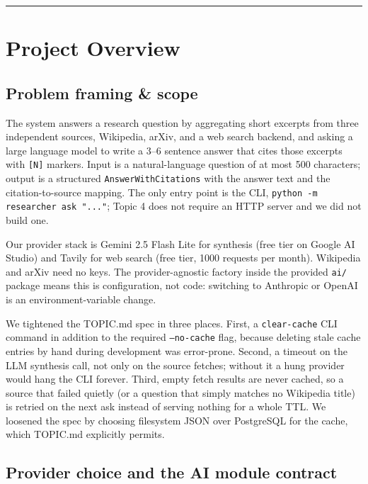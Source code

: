 \documentclass[11pt,a4paper]{article}
\begin{document}
\tableofcontents
\vspace{0.6em}\hrule\vspace{0.4em}

\section{Project Overview}

\subsection{Problem framing \& scope}

The system answers a research question by aggregating short excerpts from three independent sources, Wikipedia, arXiv, and a web search backend, and asking a large language model to write a 3--6 sentence answer that cites those excerpts with \texttt{[N]} markers. Input is a natural-language question of at most 500 characters; output is a structured \texttt{AnswerWithCitations} with the answer text and the citation-to-source mapping. The only entry point is the CLI, \texttt{python -m researcher ask "..."}; Topic 4 does not require an HTTP server and we did not build one.

Our provider stack is Gemini 2.5 Flash Lite for synthesis (free tier on Google AI Studio) and Tavily for web search (free tier, 1000 requests per month). Wikipedia and arXiv need no keys. The provider-agnostic factory inside the provided \texttt{ai/} package means this is configuration, not code: switching to Anthropic or OpenAI is an environment-variable change.

We tightened the TOPIC.md spec in three places. First, a \texttt{clear-cache} CLI command in addition to the required \texttt{--no-cache} flag, because deleting stale cache entries by hand during development was error-prone. Second, a timeout on the LLM synthesis call, not only on the source fetches; without it a hung provider would hang the CLI forever. Third, empty fetch results are never cached, so a source that failed quietly (or a question that simply matches no Wikipedia title) is retried on the next ask instead of serving nothing for a whole TTL. We loosened the spec by choosing filesystem JSON over PostgreSQL for the cache, which TOPIC.md explicitly permits.

\subsection{Provider choice and the AI module contract}
\end{document}
